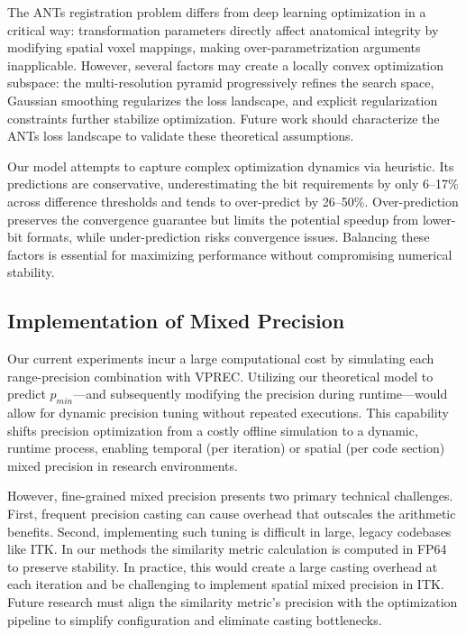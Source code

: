 \documentclass[journal,twoside,web]{ieeecolor}
\begin{document}
The ANTs registration problem differs from deep learning optimization in a critical way: transformation parameters directly affect anatomical integrity by modifying spatial voxel mappings, making over-parametrization arguments inapplicable. However, several factors may create a locally convex optimization subspace: the multi-resolution pyramid progressively refines the search space, Gaussian smoothing regularizes the loss landscape, and explicit regularization constraints further stabilize optimization. Future work should characterize the ANTs loss landscape to validate these theoretical assumptions.

Our model attempts to capture complex optimization dynamics via heuristic. Its predictions are conservative, underestimating the bit requirements by only 6--17\% across difference thresholds and tends to over-predict by 26--50\%. Over-prediction preserves the convergence guarantee but limits the potential speedup from lower-bit formats, while under-prediction risks convergence issues. Balancing these factors is essential for maximizing performance without compromising numerical stability.

\subsection{Implementation of Mixed Precision}
Our current experiments incur a large computational cost by simulating each range-precision combination with VPREC. Utilizing our theoretical model to predict $p_{min}$---and subsequently modifying the precision during runtime---would allow for dynamic precision tuning without repeated executions. This capability shifts precision optimization from a costly offline simulation to a dynamic, runtime process, enabling temporal (per iteration) or spatial (per code section) mixed precision in research environments.

However, fine-grained mixed precision presents two primary technical challenges. First, frequent precision casting can cause overhead that outscales the arithmetic benefits. Second, implementing such tuning is difficult in large, legacy codebases like ITK. In our methods the similarity metric calculation is computed in FP64 to preserve stability. In practice, this would create a large casting overhead at each iteration and be challenging to implement spatial mixed precision in ITK. Future research must align the similarity metric's precision with the optimization pipeline to simplify configuration and eliminate casting bottlenecks.
\end{document}
